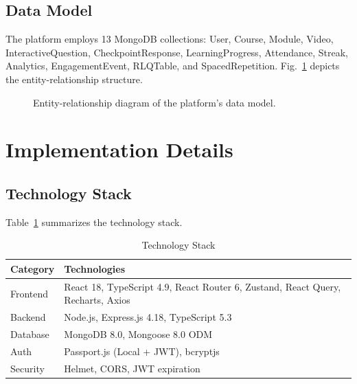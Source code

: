 \documentclass[conference]{IEEEtran}
\begin{document}
\subsection{Data Model}

The platform employs 13 MongoDB collections: User, Course, Module, Video, InteractiveQuestion, CheckpointResponse, LearningProgress, Attendance, Streak, Analytics, EngagementEvent, RLQTable, and SpacedRepetition. Fig.~\ref{fig:erd} depicts the entity-relationship structure.

\begin{figure}[htbp]
\centerline{}
\caption{Entity-relationship diagram of the platform's data model.}
\label{fig:erd}
\end{figure}

\section{Implementation Details}

\subsection{Technology Stack}

Table~\ref{tab:techstack} summarizes the technology stack.

\begin{table}[htbp]
\caption{Technology Stack}
\label{tab:techstack}
\centering
\begin{tabular}{p{2cm}p{5.5cm}}
\toprule
\textbf{Category} & \textbf{Technologies} \\
\midrule
Frontend & React 18, TypeScript 4.9, React Router 6, Zustand, React Query, Recharts, Axios \\
Backend & Node.js, Express.js 4.18, TypeScript 5.3 \\
Database & MongoDB 8.0, Mongoose 8.0 ODM \\
Auth & Passport.js (Local + JWT), bcryptjs \\
Security & Helmet, CORS, JWT expiration \\
\bottomrule
\end{tabular}
\end{table}
\end{document}
